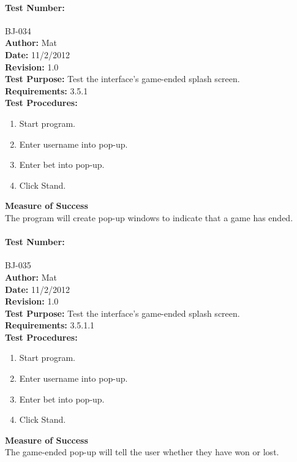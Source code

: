 \documentclass{article}
\begin{document}
\paragraph{Test Number:} BJ-034\\
\textbf{Author:} Mat\\
\textbf{Date:} 11/2/2012\\
\textbf{Revision:} 1.0\\
\textbf{Test Purpose:} Test the interface's game-ended splash screen.\\
\textbf{Requirements:} 3.5.1 \\
\textbf{Test Procedures:} 
\begin{enumerate}
\item Start program.
\item Enter username into pop-up.
\item Enter bet into pop-up.
\item Click Stand.
\end{enumerate}
\textbf{Measure of Success}\\The program will create pop-up windows to indicate that a game has ended.  
\paragraph{Test Number:} BJ-035\\
\textbf{Author:} Mat\\
\textbf{Date:} 11/2/2012\\
\textbf{Revision:} 1.0\\
\textbf{Test Purpose:} Test the interface's game-ended splash screen.\\
\textbf{Requirements:} 3.5.1.1 \\
\textbf{Test Procedures:} 
\begin{enumerate}
\item Start program.
\item Enter username into pop-up.
\item Enter bet into pop-up.
\item Click Stand.
\end{enumerate}
\textbf{Measure of Success}\\The game-ended pop-up will tell the user whether they have won or lost.
\end{document}

